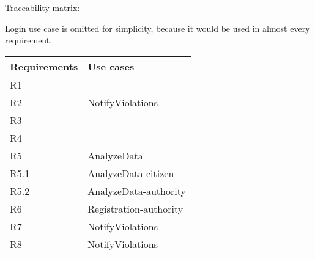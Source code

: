 \bigskip
Traceability matrix:


Login use case is omitted for simplicity, because it would be used in almost every requirement.


\begin{tabular}{|l|>{\raggedright\arraybackslash}p{8cm}|}
	\hline 
	Requirements & Use cases \\ 
	\hline 
	R1 &  \\ 
	\hline 
	R2 &  NotifyViolations\\ 
	\hline 
	R3 &  \\ 
	\hline 
	R4 &  \\ 
	\hline 
	R5 & AnalyzeData \\ 
	\hline 
	R5.1& AnalyzeData-citizen \\ 
	\hline 
	R5.2& AnalyzeData-authority \\ 
	\hline 
	R6 & Registration-authority \\ 
	\hline 
	R7 & NotifyViolations \\ 
	\hline 
	R8 & NotifyViolations \\ 
	\hline 
\end{tabular} 
